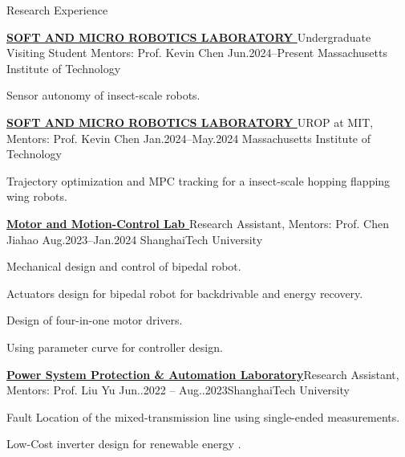 \documentclass[]{ZhongtaoGuan_CV}
\begin{document}
\begin{section}{Research Experience}
\begin{subsection}{ \textbf{\href{https://smrl.mit.edu/}{SOFT AND MICRO ROBOTICS LABORATORY }}}{Undergraduate Visiting Student Mentors: Prof. Kevin Chen}{ Jun.2024--Present }{Massachusetts Institute of Technology}
     \item{Sensor autonomy of insect-scale robots.}
 \end{subsection}
\begin{subsection}{ \textbf{\href{https://smrl.mit.edu/}{SOFT AND MICRO ROBOTICS LABORATORY }}}{UROP at MIT, Mentors: Prof. Kevin Chen}{ Jan.2024--May.2024 }{Massachusetts Institute of Technology}
     \item{Trajectory optimization and MPC tracking for a insect-scale hopping flapping wing robots.}
 \end{subsection}
 
\begin{subsection}{ \textbf{\href{https://faculty.sist.shanghaitech.edu.cn/chenjh/}{Motor and Motion-Control Lab }}}{Research Assistant, Mentors: Prof. Chen Jiahao}{ Aug.2023--Jan.2024 }{ShanghaiTech University}
     \item{Mechanical design and control of bipedal robot.}
     \item{ Actuators design for bipedal robot for backdrivable and energy recovery.}
     \item{Design of four-in-one motor drivers.}
     \item {Using parameter curve for controller design.}
 \end{subsection}
 \begin{subsection}{\textbf{\href{https://pspal.shanghaitech.edu.cn/}{Power System Protection \& Automation Laboratory}}}{Research Assistant, Mentors: Prof. Liu Yu}{ Jun..2022 -- Aug..2023}{ShanghaiTech University}
     \item{Fault Location of the mixed-transmission line using single-ended measurements.}
     \item{Low-Cost inverter design for  renewable energy .}
 \end{subsection}
 
\end{section}

\newpage
\end{document}
